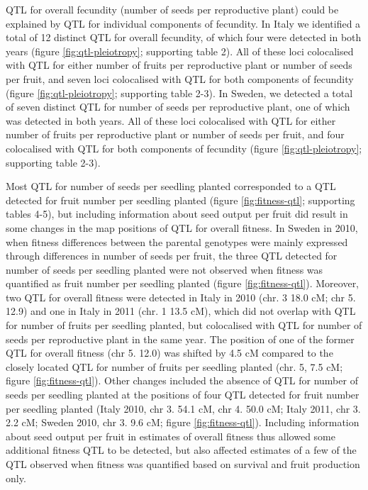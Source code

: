 \documentclass[12pt,]{article}
\begin{document}
QTL for overall fecundity (number of seeds per reproductive plant) could be explained by QTL for individual components of fecundity.
In Italy we identified a total of 12 distinct QTL for overall fecundity, of which four were detected in both years (figure \ref{fig:qtl-pleiotropy}; supporting table 2).
All of these loci colocalised with QTL for either number of fruits per reproductive plant or number of seeds per fruit, and seven loci colocalised with QTL for both components of fecundity (figure \ref{fig:qtl-pleiotropy}; supporting table 2-3).
In Sweden, we detected a total of seven distinct QTL for number of seeds per reproductive plant, one of which was detected in both years.
All of these loci colocalised with QTL for either number of fruits per reproductive plant or number of seeds per fruit, and four colocalised with QTL for both components of fecundity (figure \ref{fig:qtl-pleiotropy}; supporting table 2-3).

Most QTL for number of seeds per seedling planted corresponded to a QTL detected for fruit number per seedling planted (figure \ref{fig:fitness-qtl}; supporting tables 4-5), but including information about seed output per fruit did result in some changes in the map positions of QTL for overall fitness.
In Sweden in 2010, when fitness differences between the parental genotypes were mainly expressed through differences in number of seeds per fruit, the three QTL detected for number of seeds per seedling planted were not observed when fitness was quantified as fruit number per seedling planted (figure \ref{fig:fitness-qtl}).
Moreover, two QTL for overall fitness were detected in Italy in 2010 (chr. 3 18.0 cM; chr 5. 12.9) and one in Italy in 2011 (chr. 1 13.5 cM), which did not overlap with QTL for number of fruits per seedling planted, but colocalised with QTL for number of seeds per reproductive plant in the same year.
The position of one of the former QTL for overall fitness (chr 5. 12.0) was shifted by 4.5 cM compared to the closely located QTL for number of fruits per seedling planted (chr. 5, 7.5 cM; figure \ref{fig:fitness-qtl}).
Other changes included the absence of QTL for number of seeds per seedling planted at the positions of four QTL detected for fruit number per seedling planted (Italy 2010, chr 3. 54.1 cM, chr 4. 50.0 cM; Italy 2011, chr 3. 2.2 cM; Sweden 2010, chr 3. 9.6 cM; figure \ref{fig:fitness-qtl}). Including information about seed output per fruit in estimates of overall fitness thus allowed some additional fitness QTL to be detected, but also affected estimates of a few of the QTL observed when fitness was quantified based on survival and fruit production only.
\end{document}
